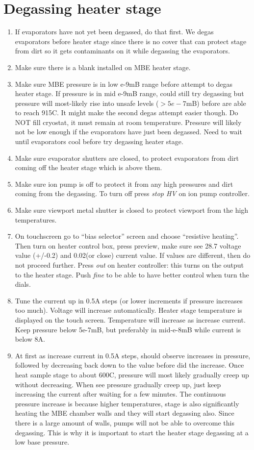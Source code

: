 \section{Degassing heater stage}
\begin{enumerate}
\item	If evaporators have not yet been degassed, do that first. We degas evaporators before heater stage since there is no cover that can protect stage from dirt so it gets contaminants on it while degassing the evaporators.
\item	Make sure there is a blank installed on MBE heater stage. 
\item	Make sure MBE pressure is in low e-9mB range before attempt to degas heater stage. If pressure is in mid e-9mB range, could still try degassing but pressure will most-likely rise into unsafe levels ($>5e-7$mB) before are able to reach 915C. It might make the second degas attempt easier though. Do NOT fill cryostat, it must remain at room temperature. Pressure will likely not be low enough if the evaporators have just been degassed. Need to wait until evaporators cool before try degassing heater stage. 
\item	Make sure evaporator shutters are closed, to protect evaporators from dirt coming off the heater stage which is above them.
\item	Make sure ion pump is off to protect it from any high pressures and dirt coming from the degassing. To turn off press \emph{stop HV} on ion pump controller.
\item	Make sure viewport metal shutter is closed to protect viewport from the high temperatures.
\item	On touchscreen go to “bias selector” screen and choose “resistive heating”. Then turn on heater control box, press preview, make sure see 28.7 voltage value (+/-0.2) and 0.02(or close) current value. If values are different, then do not proceed further. Press \emph{out} on heater controller: this turns on the output to the heater stage. Push \emph{fine} to be able to have better control when turn the dials. 
\item	Tune the current up in 0.5A steps (or lower increments if pressure increases too much).  Voltage will increase automatically. Heater stage temperature is displayed on the touch screen. Temperature will increase as increase current. Keep pressure below 5e-7mB, but preferably in mid-e-8mB while current is below 8A.
\item	At first as increase current in 0.5A steps, should observe increases in pressure, followed by decreasing back down to the value before did the increase. Once heat sample stage to about 600C, pressure will most likely gradually creep up without decreasing. When see pressure gradually creep up, just keep increasing the current after waiting for a few minutes. The continuous pressure increase is because higher temperatures, stage is also significantly heating the MBE chamber walls and they will start degassing also. Since there is a large amount of walls, pumps will not be able to overcome this degassing. This is why it is important to start the heater stage degassing at a low base pressure.

\end{enumerate}
